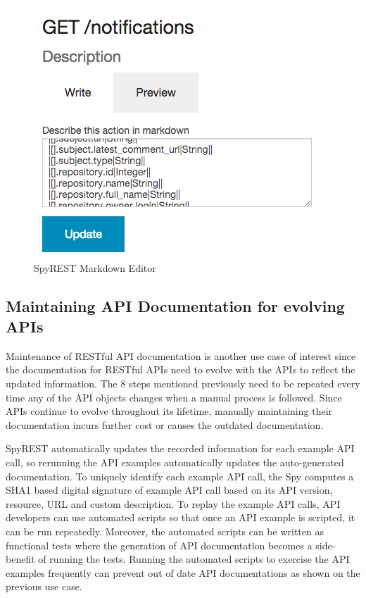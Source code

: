 \documentclass[conference]{IEEEtran}
\begin{document}
\begin{figure}[!tbh]
  \centering
  \includegraphics[width=0.8\linewidth]{edit.png}
  \caption{SpyREST Markdown Editor}
  \label{fig:markdown}
\end{figure}

\subsection{Maintaining API Documentation for evolving APIs} %
Maintenance of RESTful API documentation is another use case of interest since the documentation for RESTful APIs need to evolve with the APIs to reflect the updated information. The 8 steps mentioned previously need to be repeated every time any of the API objects changes when a manual process is followed. Since APIs continue to evolve throughout its lifetime, manually maintaining their documentation incurs further cost or causes the outdated documentation.

SpyREST automatically updates the recorded information for each example API call, so rerunning the API examples automatically updates the auto-generated documentation. To uniquely identify each example API call, the Spy computes a SHA1 based digital signature of example API call based on its API version, resource, URL and custom description. To replay the example API calls, API developers can use automated scripts so that once an API example is scripted, it can be run repeatedly. Moreover, the automated scripts can be written as functional tests where the generation of API documentation becomes a side-benefit of running the tests. Running the automated scripts to exercise the API examples frequently can prevent out of date API documentations as shown on the previous use case.
\end{document}
